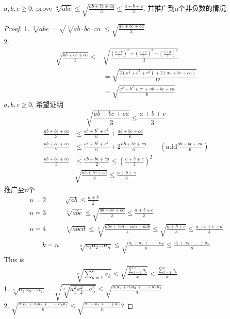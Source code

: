 \begin{example}
	$ a,b,c\ge 0. $ prove $ \sqrt[3]{abc}\le\sqrt{\frac{ab+bc+ca}{3}} \le \frac{a+b+c}{3} $.
	并推广到n个非负数的情况
	\begin{proof}
		1. $ \sqrt[3]{abc} = \sqrt{\sqrt[3]{ab\cdot bc\cdot ca}} \le \sqrt{\frac{ab+bc+ca}{3}} $.\\
		2. 
		\begin{align*}
			\sqrt{\frac{ab+bc+ca}{3}} 
			\le &\sqrt{\frac{(\frac{a+b}{2})^2+(\frac{b+c}{2})^2+(\frac{c+a}{2})^2}{3}} \\
			&= \sqrt{\frac{2(a^2+b^2+c^2)+2(ab+bc+ca)}{12}}\\
			&= \sqrt{\frac{a^2+b^2+c^2+ab+bc+ca}{6}}
		\end{align*}
		$ a,b,c\ge 0 $, 希望证明\[\sqrt{\frac{ab+bc+ca}{3}}\le \frac{a+b+c}{3}\]
		\begin{align*}
			\frac{ab+bc+ca}{3} &\le \frac{a^2+b^2+c^2}{6} + \frac{ab+bc+ca}{6}\\
			\frac{ab+bc+ca}{2} &\le \frac{a^2+b^2+c^2}{6} + 2\frac{ab+bc+ca}{6}\qquad(\text{add} \frac{ab+bc+ca}{6})\\
			\frac{ab+bc+ca}{3} &\le \frac{ab+bc+ca}{2} \le (\frac{a+b+c}{3})^2\\
			&\sqrt{\frac{ab+bc+ca}{3}} \le \frac{a+b+c}{3}
		\end{align*}
		推广至n个
		\begin{align*}[l]
			n=2\qquad& \sqrt{ab} \le\frac{a+b}{2}\\
			n=3\qquad& \sqrt[3]{abc}  \le \sqrt{\frac{ab+bc+ca}{3}} \le \frac{a+b+c}{3}\\
			n=4\qquad& \sqrt[4]{abcd}  \le \sqrt[3]{\frac{abc+bcd+cda+dab}{4}} \le \sqrt{\frac{a+b+c}{3}}\le\frac{a+b+c+d}{4}
		\end{align*}
		\begin{align*}
			k = n \qquad& \sqrt[n]{a_1a_2\dots a_n} \le 		\sqrt{\frac{a_1+a_2+\dots+a_n}{n}}\le\frac{a_1+a_2+\dots+a_n}{n}
		\end{align*}
		This is
		\begin{align*}
			\sqrt[n]{\sum_{k=1}^n a_k} \le \sqrt{\frac{\sum_{k=1}^n a_k}{k}}\le\frac{\sum_{k=1}^n a_k}{k}
		\end{align*}
		1. $ \sqrt[n]{a_1 a_2 \dots a_n} = \sqrt{\sqrt[n]{a_1^2 a_2^2 \dots a_n^2}} \le \sqrt{\frac{a_1 a_2 + a_2 a_3 + \dots + a_n a_1}{n}}$\\
		2. $ \sqrt{\frac{a_1 a_2 + a_2 a_3 + \dots + a_n a_1}{n}} \le \sqrt{\frac{a_1+ a_2 + \dots + a_n}{n}} $?
	\end{proof}
\end{example}

